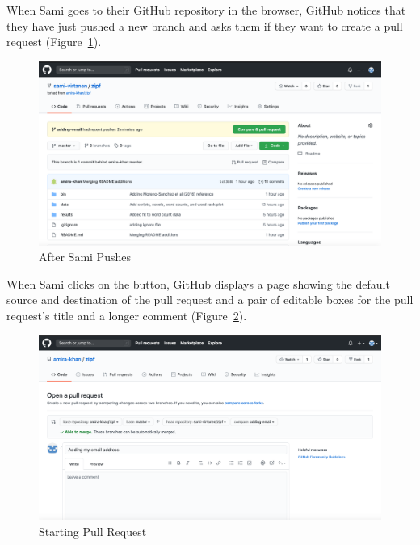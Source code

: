 \documentclass[
]{krantz}
\begin{document}
When Sami goes to their GitHub repository in the browser,
GitHub notices that they have just pushed a new branch
and asks them if they want to create a pull request
(Figure~\ref{fig:git-advanced-after-sami-pushes}).

\begin{figure}

{\centering \includegraphics[width=1\linewidth]{figures/git-advanced/after-sami-pushes} 

}

\caption{After Sami Pushes}\label{fig:git-advanced-after-sami-pushes}
\end{figure}

When Sami clicks on the button,
GitHub displays a page showing the default source and destination of the pull request
and a pair of editable boxes for the pull request's title and a longer comment
(Figure~\ref{fig:git-advanced-pull-request-start}).

\begin{figure}

{\centering \includegraphics[width=1\linewidth]{figures/git-advanced/open-pull-request} 

}

\caption{Starting Pull Request}\label{fig:git-advanced-pull-request-start}
\end{figure}
\end{document}
